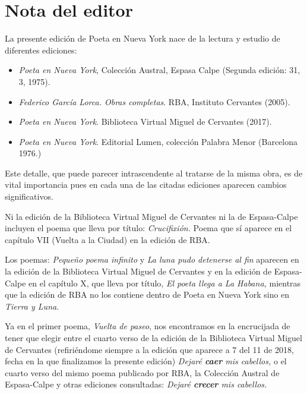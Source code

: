 \documentclass[
    a5paper,
    DIV=10,
    12pt,
    notitlepage,
    oneside,]
{scrbook} %
\begin{document}
\newpage

\section*{Nota del editor}

La presente edición de Poeta en Nueva York nace de la lectura y estudio
de diferentes ediciones:

\begin{itemize}

\item \emph{Poeta en Nueva York}, Colección Austral, Espasa Calpe (Segunda
edición: 31, 3, 1975).

\item \emph{Federico García Lorca. Obras completas}. RBA, Instituto Cervantes
(2005).

\item \emph{Poeta en Nueva York}. Biblioteca Virtual Miguel de Cervantes (2017).

\item \emph{Poeta en Nueva York}. Editorial Lumen, colección Palabra Menor
(Barcelona 1976.)

\end{itemize}

Este detalle, que puede parecer intrascendente al tratarse de la misma
obra, es de vital importancia pues en cada una de las citadas ediciones
aparecen cambios significativos.

Ni la edición de la Biblioteca Virtual Miguel de Cervantes ni la de
Espasa-Calpe incluyen el poema que lleva por título: \emph{Crucifixión.}
Poema que sí aparece en el capítulo VII (Vuelta a la Ciudad) en la
edición de RBA.

Los poemas: \emph{Pequeño poema infinito} y \emph{La luna pudo detenerse
al fin} aparecen en la edición de la Biblioteca Virtual Miguel de
Cervantes y en la edición de Espasa-Calpe en el capítulo X, que lleva
por título, \emph{El poeta llega a La Habana,} mientras que la edición
de RBA no los contiene dentro de Poeta en Nueva York sino en
\emph{Tierra y Luna}.

Ya en el primer poema, \emph{Vuelta de paseo}, nos encontramos en la
encrucijada de tener que elegir entre el cuarto verso de la edición de
la Biblioteca Virtual Miguel de Cervantes (refiriéndome siempre a la
edición que aparece a 7 del 11 de 2018, fecha en la que finalizamos la
presente edición) \emph{Dejaré \textbf{caer} mis cabellos,} o el cuarto
verso del mismo poema publicado por RBA, la Colección Austral de
Espasa-Calpe y otras ediciones consultadas: \emph{Dejaré \textbf{crecer}
mis cabellos.}
\end{document}
